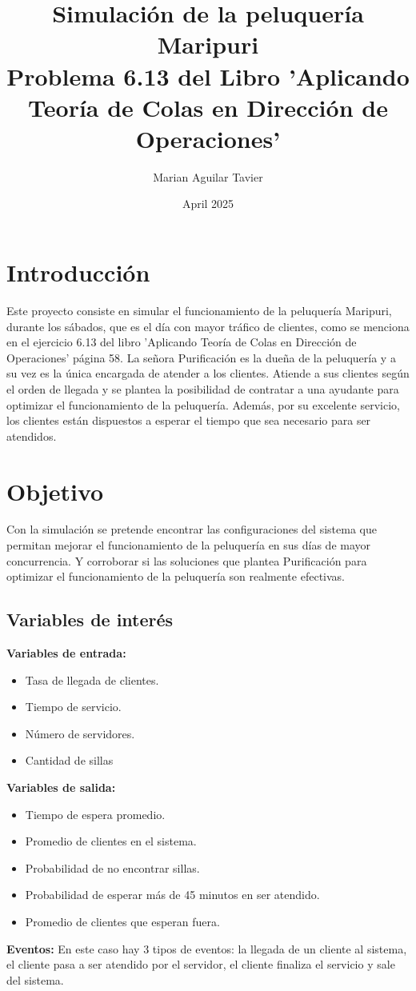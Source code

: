 \documentclass{article}
\title{Simulación de la peluquería Maripuri\\ Problema 6.13 del Libro 'Aplicando Teoría de Colas en Dirección de Operaciones' }
\author{Marian Aguilar Tavier}
\date{April 2025}
\begin{document}
\maketitle

\section{Introducción}
Este proyecto consiste en simular el funcionamiento de la peluquería Maripuri, durante los sábados, que es el día con mayor tráfico de clientes, como se menciona en el ejercicio 6.13 del libro 'Aplicando Teoría de Colas en Dirección de Operaciones' página 58.
La señora Purificación es la dueña de la peluquería y a su vez es la única encargada de atender a los clientes. Atiende a sus clientes según el orden de llegada y se plantea la posibilidad de contratar a una ayudante para optimizar el funcionamiento de la peluquería. Además, por su excelente servicio, los clientes están dispuestos a esperar el tiempo que sea necesario para ser atendidos.

\section{Objetivo}

Con la simulación se pretende encontrar las configuraciones del sistema que permitan mejorar el funcionamiento de la peluquería en sus días de mayor concurrencia. Y corroborar si las soluciones que plantea Purificación para optimizar el funcionamiento de la peluquería son realmente efectivas.

\subsection{Variables de interés}
\textbf{Variables de entrada:}
\begin{itemize}
    \item Tasa de llegada de clientes.
    \item Tiempo de servicio.
    \item Número de servidores.
    \item Cantidad de sillas
\end{itemize}
\textbf{Variables de salida:}
\begin{itemize}
    \item Tiempo de espera promedio.
    \item Promedio de clientes en el sistema.
    \item Probabilidad de no encontrar sillas.
    \item Probabilidad de esperar más de 45 minutos en ser atendido.
    \item Promedio de clientes que esperan fuera.
\end{itemize}
\textbf{Eventos:}
En este caso hay 3 tipos de eventos: la llegada de un cliente al sistema, el cliente pasa a ser atendido por el servidor, el cliente finaliza el servicio y sale del sistema.
\end{document}
